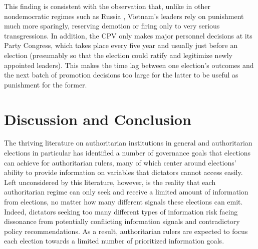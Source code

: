 \documentclass[12pt]{article}
\newcommand\fnote[1]{\footnote{\baselineskip=2\normalbaselineskip#1}}
\newcommand{\1}{\mathbbm{1}}
\begin{document}
This finding is consistent with the observation that, unlike in other nondemocratic regimes such as Russia \citep{Myagkov2009}, Vietnam's leaders rely on punishment much more sparingly, reserving demotion or firing only to very serious transgressions. %
In addition, the CPV only makes major personnel decisions at its Party Congress, which takes place every five year and usually just before an election (presumably so that the election could ratify and legitimize newly appointed leaders). This makes the time lag between one election's outcomes and the next batch of promotion decisions too large for the latter to be useful as punishment for the former.

\section{Discussion and Conclusion}

The thriving literature on authoritarian institutions in general and authoritarian elections in particular has identified a number of governance goals that elections can achieve for authoritarian rulers, many of which center around elections' ability to provide information on variables that dictators cannot access easily. Left unconsidered by this literature, however, is the reality that each authoritarian regime can only seek and receive a limited amount of information from elections, no matter how many different signals these elections can emit. Indeed, dictators seeking too many different types of information risk facing dissonance from potentially conflicting information signals and contradictory policy recommendations. As a result, authoritarian rulers are expected to focus each election towards a limited number of prioritized information goals.
\end{document}
